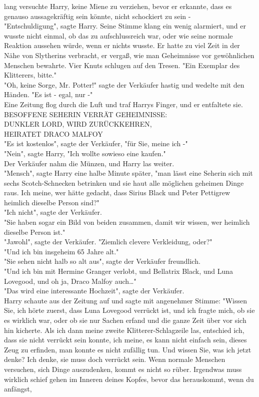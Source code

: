 {lang versuchte Harry, keine Miene zu verziehen, bevor er erkannte, dass es genauso aussagekräftig sein könnte, nicht schockiert zu sein -\\ "Entschuldigung", sagte Harry. Seine Stimme klang ein wenig alarmiert, und er wusste nicht einmal, ob das zu aufschlussreich war, oder wie seine normale Reaktion aussehen würde, wenn er nichts wusste. Er hatte zu viel Zeit in der Nähe von Slytherins verbracht, er vergaß, wie man Geheimnisse vor gewöhnlichen Menschen bewahrte. Vier Knuts schlugen auf den Tresen. "Ein Exemplar des Klitterers, bitte."\\ "Oh, keine Sorge, Mr. Potter!" sagte der Verkäufer hastig und wedelte mit den Händen. "Es ist - egal, nur -"\\ Eine Zeitung flog durch die Luft und traf Harrys Finger, und er entfaltete sie.\\ BESOFFENE SEHERIN VERRÄT GEHEIMNISSE:\\ DUNKLER LORD, WIRD ZURÜCKKEHREN,\\ HEIRATET DRACO MALFOY\\ "Es ist kostenlos", sagte der Verkäufer, "für Sie, meine ich -"\\ "Nein", sagte Harry, "Ich wollte sowieso eine kaufen."\\ Der Verkäufer nahm die Münzen, und Harry las weiter.\\ "Mensch", sagte Harry eine halbe Minute später, "man lässt eine Seherin sich mit sechs Scotch-Schnecken betrinken und sie haut alle möglichen geheimen Dinge raus. Ich meine, wer hätte gedacht, dass Sirius Black und Peter Pettigrew heimlich dieselbe Person sind?"\\ "Ich nicht", sagte der Verkäufer.\\ "Sie haben sogar ein Bild von beiden zusammen, damit wir wissen, wer heimlich dieselbe Person ist."\\ "Jawohl", sagte der Verkäufer. "Ziemlich clevere Verkleidung, oder?"\\ "Und ich bin insgeheim 65 Jahre alt."\\ "Sie sehen nicht halb so alt aus", sagte der Verkäufer freundlich.\\ "Und ich bin mit Hermine Granger verlobt, und Bellatrix Black, und Luna Lovegood, und oh ja, Draco Malfoy auch…"\\ "Das wird eine interessante Hochzeit", sagte der Verkäufer.\\ Harry schaute aus der Zeitung auf und sagte mit angenehmer Stimme: "Wissen Sie, ich hörte zuerst, dass Luna Lovegood verrückt ist, und ich fragte mich, ob sie es wirklich war, oder ob sie nur Sachen erfand und die ganze Zeit über vor sich hin kicherte. Als ich dann meine zweite Klitterer-Schlagzeile las, entschied ich, dass sie nicht verrückt sein konnte, ich meine, es kann nicht einfach sein, dieses Zeug zu erfinden, man konnte es nicht zufällig tun. Und wissen Sie, was ich jetzt denke? Ich denke, sie muss doch verrückt sein. Wenn normale Menschen versuchen, sich Dinge auszudenken, kommt es nicht so rüber. Irgendwas muss wirklich schief gehen im Inneren deines Kopfes, bevor das herauskommt, wenn du anfängst, }
